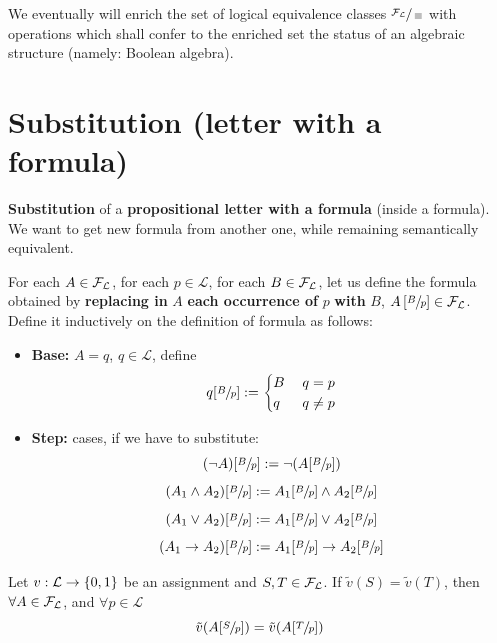 	We eventually will enrich the set of logical equivalence classes $\sfrac{\mathcal{F}_\mathcal{L}}{\equiv}$ with operations which shall confer to the enriched set the status of an algebraic structure (namely: Boolean algebra). \vspace{-0.5cm}

	\section{Substitution (letter with a formula)}

	\textbf{Substitution} of a \textbf{propositional letter with a formula} (inside a formula). We want to get new formula from another one, while remaining semantically equivalent.


	\noindent
	For each $A \in \mathcal{F}_\mathcal{L}$, for each $p \in \mathcal{L}$, for each $B \in \mathcal{F}_\mathcal{L}$, let us define the formula obtained by \textbf{replacing in} $A$ \textbf{each occurrence of} $p$ \textbf{with} $B$, $A\left[\sfrac{B}{p}\right] \in \mathcal{F}_\mathcal{L}$. Define it inductively on the definition of formula as follows:
	\begin{itemize}
		\item \textbf{Base:} $A = q$, $q \in \mathcal{L}$, define
		$$q[\sfrac{B}{p}] := \begin{cases}
			B \; & q = p  \\
			q \;  & q \neq p
		\end{cases}
		$$

		\item \textbf{Step:} cases, if we have to substitute:
		$$ (\neg A)[\sfrac{B}{p}] := \neg(A[\sfrac{B}{p}]) $$
		$$ (A_1 \wedge A_2) [\sfrac{B}{p}] := A_1 [\sfrac{B}{p}] \wedge A_2 [\sfrac{B}{p}] $$
		$$ (A_1 \vee A_2) [\sfrac{B}{p}] := A_1 [\sfrac{B}{p}] \vee A_2 [\sfrac{B}{p}] $$
		$$ (A_1 \rightarrow A_2) [\sfrac{B}{p}] := A_1 [\sfrac{B}{p}] \rightarrow A_2 [\sfrac{B}{p}] $$
	\end{itemize}

	\begin{lemma}[Substitution] \label{lemma:subst}
	Let $v: \mathcal{L} \rightarrow \{0,1\}$ be an assignment and $S,T \in \mathcal{F}_\mathcal{L}$. If $\tilde{v}(S) = \tilde{v} (T)$, then $\forall A \in \mathcal{F}_\mathcal{L}$, and $\forall p \in \mathcal{L}$
	$$ \tilde{v} (A [\sfrac{S}{p}]) = \tilde{v} (A[\sfrac{T}{p}]) $$
	\end{lemma}

